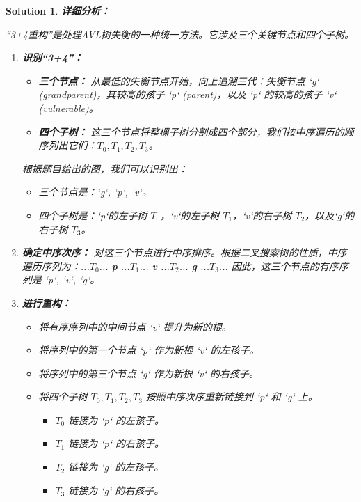 \documentclass[UTF8]{report}
\newtheorem{solution}{Solution}
\theoremstyle{MyLineTheoremStyle} %
\theoremstyle{MyBlockTheoremStyle} %
\theoremstyle{MySubsubsectionStyle} %
\begin{document}
\begin{solution}
\textbf{详细分析：}

“3+4重构”是处理AVL树失衡的一种统一方法。它涉及三个关键节点和四个子树。
\begin{enumerate}
    \item \textbf{识别“3+4”：}
    \begin{itemize}
        \item \textbf{三个节点：} 从最低的失衡节点开始，向上追溯三代：失衡节点 `g` (grandparent)，其较高的孩子 `p` (parent)，以及 `p` 的较高的孩子 `v` (vulnerable)。
        \item \textbf{四个子树：} 这三个节点将整棵子树分割成四个部分，我们按中序遍历的顺序列出它们：$T_0, T_1, T_2, T_3$。
    \end{itemize}
    根据题目给出的图，我们可以识别出：
    \begin{itemize}
        \item 三个节点是：`g`, `p`, `v`。
        \item 四个子树是：`p`的左子树 $T_0$，`v`的左子树 $T_1$，`v`的右子树 $T_2$，以及`g`的右子树 $T_3$。
    \end{itemize}

    \item \textbf{确定中序次序：}
    对这三个节点进行中序排序。根据二叉搜索树的性质，中序遍历序列为：...$T_0$... \textbf{p} ...$T_1$... \textbf{v} ...$T_2$... \textbf{g} ...$T_3$...
    因此，这三个节点的有序序列是 `p`, `v`, `g`。

    \item \textbf{进行重构：}
    \begin{itemize}
        \item 将有序序列中的中间节点 `v` 提升为新的根。
        \item 将序列中的第一个节点 `p` 作为新根 `v` 的左孩子。
        \item 将序列中的第三个节点 `g` 作为新根 `v` 的右孩子。
        \item 将四个子树 $T_0, T_1, T_2, T_3$ 按照中序次序重新链接到 `p` 和 `g` 上。
            \begin{itemize}
                \item $T_0$ 链接为 `p` 的左孩子。
                \item $T_1$ 链接为 `p` 的右孩子。
                \item $T_2$ 链接为 `g` 的左孩子。
                \item $T_3$ 链接为 `g` 的右孩子。
            \end{itemize}
    \end{itemize}
\end{enumerate}


\end{solution}
\end{document}
